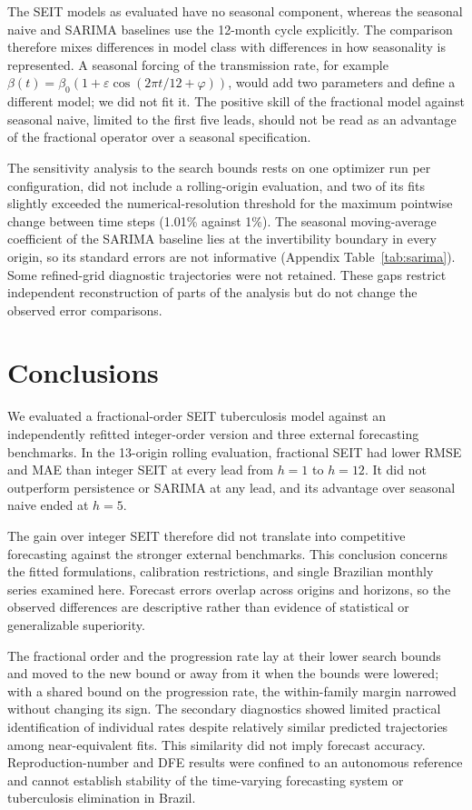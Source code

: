 \documentclass[pdflatex,sn-mathphys-ay,lineno]{sn-jnl}
\begin{document}
The SEIT models as evaluated have no seasonal component, whereas the seasonal naive and SARIMA baselines use the 12-month cycle explicitly. The comparison therefore mixes differences in model class with differences in how seasonality is represented. A seasonal forcing of the transmission rate, for example $\beta(t)=\beta_0\left(1+\varepsilon\cos(2\pi t/12+\varphi)\right)$, would add two parameters and define a different model; we did not fit it. The positive skill of the fractional model against seasonal naive, limited to the first five leads, should not be read as an advantage of the fractional operator over a seasonal specification.

The sensitivity analysis to the search bounds rests on one optimizer run per configuration, did not include a rolling-origin evaluation, and two of its fits slightly exceeded the numerical-resolution threshold for the maximum pointwise change between time steps (1.01\% against 1\%). The seasonal moving-average coefficient of the SARIMA baseline lies at the invertibility boundary in every origin, so its standard errors are not informative (Appendix Table~\ref{tab:sarima}). Some refined-grid diagnostic trajectories were not retained. These gaps restrict independent reconstruction of parts of the analysis but do not change the observed error comparisons.

\section{Conclusions}

We evaluated a fractional-order SEIT tuberculosis model against an independently refitted integer-order version and three external forecasting benchmarks. In the 13-origin rolling evaluation, fractional SEIT had lower RMSE and MAE than integer SEIT at every lead from $h=1$ to $h=12$. It did not outperform persistence or SARIMA at any lead, and its advantage over seasonal naive ended at $h=5$.

The gain over integer SEIT therefore did not translate into competitive forecasting against the stronger external benchmarks. This conclusion concerns the fitted formulations, calibration restrictions, and single Brazilian monthly series examined here. Forecast errors overlap across origins and horizons, so the observed differences are descriptive rather than evidence of statistical or generalizable superiority.

The fractional order and the progression rate lay at their lower search bounds and moved to the new bound or away from it when the bounds were lowered; with a shared bound on the progression rate, the within-family margin narrowed without changing its sign. The secondary diagnostics showed limited practical identification of individual rates despite relatively similar predicted trajectories among near-equivalent fits. This similarity did not imply forecast accuracy. Reproduction-number and DFE results were confined to an autonomous reference and cannot establish stability of the time-varying forecasting system or tuberculosis elimination in Brazil.
\end{document}
